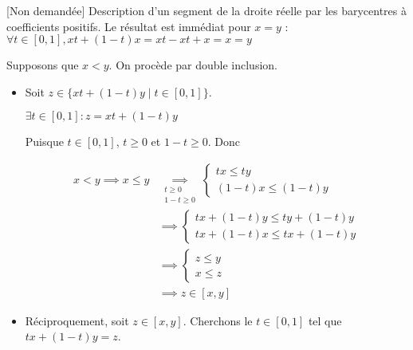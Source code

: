 \documentclass{article}
\renewenvironment{question_kholle}[2][ ]
{
	\subsection{\texorpdfstring{#2}{}}
	\notblank{#1}
	{
		\noindent #1
		\bigbreak
	}
	{}
	\begin{proof}
}
{
	\end{proof}
}
\begin{document}
\begin{question_kholle}[{
				Soient $(x, y) \in \R^2$ tels que
				$x \leqslant y$. $$[x, y] = \{z \in
					\R \mid x \leqslant z \leqslant y
					\} = \{tx + (1-t)y \mid t \in [0, 1]\}$$
			}]{[Non demandée] Description d'un
		segment de la droite réelle par les
		barycentres à coefficients positifs.}
	Le résultat est immédiat pour $x = y$ :
	$\forall t \in [0, 1], xt+(1-t)x = xt -
		xt +x =x = y$

	Supposons que $x <y$. On procède par
	double inclusion.
	\begin{itemize}[label=$\star$]
		\item Soit $z \in \{ xt+(1-t)y \mid t
			      \in [0, 1] \}$.

		      $\exists t \in [0, 1] : z = xt+(1-t)y$

		      Puisque $t \in [0, 1]$, $t
			      \geqslant 0$ et $1-t \geqslant 0$.
		      Donc

		      \begin{align*}
			      x < y \implies x\leqslant y &
			      \underset{ \substack{t \geqslant
			      0                                                  \\1-t
					      \geqslant 0} }{ \implies } \left\{
			      \begin{array}{ll}
				      tx \leqslant ty \\
				      (1-t)x \leqslant (1-t)y
			      \end{array}\right.                             \\
			                                  & \implies \left\{
			      \begin{array}{ll}
				      tx + (1-t)y \leqslant ty + (1-t) y \\
				      tx + (1-t)x  \leqslant tx + (1-t)y
			      \end{array}\right.                 \\
			                                  & \implies \left\{
			      \begin{array}{ll}
				      z \leqslant y \\
				      x \leqslant z
			      \end{array}\right.                                 \\
			                                  & \implies z \in[x, y]
		      \end{align*}

		\item Réciproquement, soit $z
			      \in[x, y]$. Cherchons le
		      $t\in[0, 1]$ tel que $tx + (1-t)y = z$.


\end{itemize}
\end{question_kholle}
\end{document}
